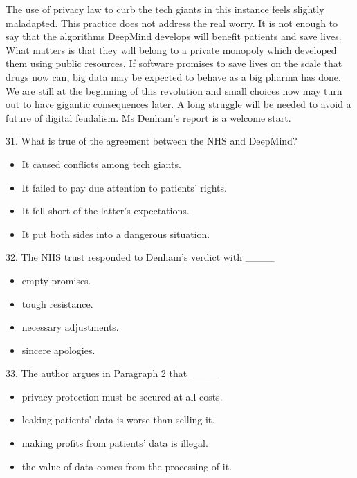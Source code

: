 \documentclass[UTF8,11pt]{ctexart}
\begin{document}
The use of privacy law to curb the tech giants in this instance feels slightly maladapted. This practice does not address the real worry. It is not enough to say that the algorithms DeepMind develops will benefit patients and save lives. What matters is that they will belong to a private monopoly which developed them using public resources. If software promises to save lives on the scale that drugs now can, big data may be expected to behave as a big pharma has done. We are still at the beginning of this revolution and small choices now may turn out to have gigantic consequences later. A long struggle will be needed to avoid a future of digital feudalism. Ms Denham’s report is a welcome start.


31. What is true of the agreement between the NHS and DeepMind?


\begin{itemize}[leftmargin=2em,itemsep=.2em,topsep=.4em]\item[A.] It caused conflicts among tech giants.
\item[B.] It failed to pay due attention to patients’ rights.
\item[C.] It fell short of the latter’s expectations.
\item[D.] It put both sides into a dangerous situation.
\end{itemize}

32. The NHS trust responded to Denham’s verdict with \_\_\_\_


\begin{itemize}[leftmargin=2em,itemsep=.2em,topsep=.4em]\item[A.] empty promises.
\item[B.] tough resistance.
\item[C.] necessary adjustments.
\item[D.] sincere apologies.
\end{itemize}

33. The author argues in Paragraph 2 that \_\_\_\_


\begin{itemize}[leftmargin=2em,itemsep=.2em,topsep=.4em]\item[A.] privacy protection must be secured at all costs.
\item[B.] leaking patients’ data is worse than selling it.
\item[C.] making profits from patients’ data is illegal.
\item[D.] the value of data comes from the processing of it.
\end{itemize}
\end{document}
